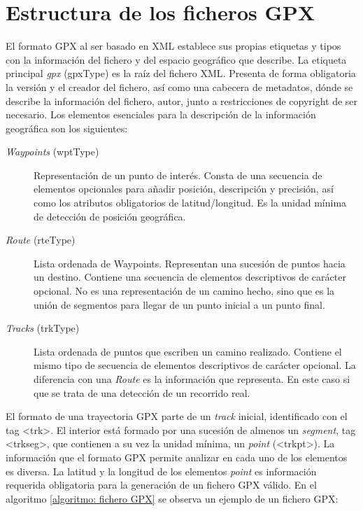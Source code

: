 \section{Estructura de los ficheros \ac{GPX}}
El formato \ac{GPX} al ser basado en \ac{XML} establece sus propias etiquetas y tipos 
con la información del fichero y del espacio geográfico que describe. La etiqueta 
principal \textit{gpx} (gpxType) es la raíz del fichero \ac{XML}. Presenta de forma 
obligatoria la versión y el creador del fichero, así como una cabecera de metadatos, 
dónde se describe la información del fichero, autor, junto a restricciones de copyright 
de ser necesario. Los elementos esenciales para la descripción de la información 
geográfica son los siguientes:
\begin{description}
\item[\textit{Waypoints} (wptType)] Representación de un punto de interés. Consta de 
una secuencia de elementos opcionales para añadir posición, descripción y precisión, 
así como los atributos obligatorios de latitud/longitud. Es la unidad mínima de detección 
de posición geográfica.

\item[\textit{Route} (rteType)] Lista ordenada de Waypoints.  Representan una 
sucesión de puntos hacia un destino. Contiene una secuencia de elementos 
descriptivos de carácter opcional. No es una representación de un camino hecho, sino 
que es la unión de segmentos para llegar de un punto inicial a un punto final. 

\item[\textit{Tracks} (trkType)] Lista ordenada de puntos que escriben un camino 
realizado. Contiene el mismo tipo de secuencia de elementos descriptivos de carácter 
opcional. La diferencia con una \textit{Route} es la información que representa. En este 
caso si que se trata de una detección de un recorrido real. 
\end{description}

El formato de una trayectoria \ac{GPX} parte de un \textit{track} inicial, identificado con 
el tag <trk>. El interior está formado por una sucesión de almenos un \textit{segment}, 
tag <trkseg>, que contienen a su vez la unidad mínima, un \textit{point} (<trkpt>). La 
información que el formato \ac{GPX} permite analizar en cada uno de los elementos es 
diversa. La latitud y la longitud de los elementos \textit{point} es información requerida 
obligatoria para la generación de un fichero \ac{GPX} válido. En el algoritmo 
\ref{algoritmo: fichero GPX} se observa un ejemplo de un fichero \ac{GPX}:

